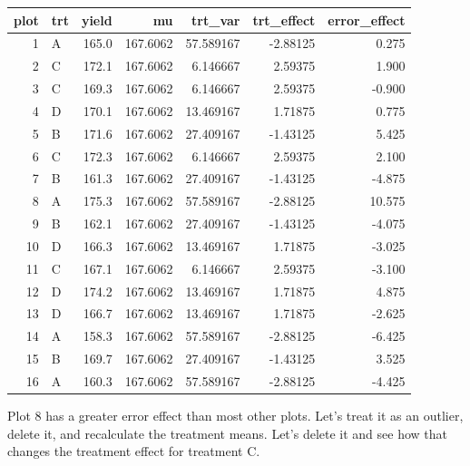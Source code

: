 \documentclass[
]{book}
\begin{document}
\begin{tabular}{r|l|r|r|r|r|r}
\hline
plot & trt & yield & mu & trt\_var & trt\_effect & error\_effect\\
\hline
1 & A & 165.0 & 167.6062 & 57.589167 & -2.88125 & 0.275\\
\hline
2 & C & 172.1 & 167.6062 & 6.146667 & 2.59375 & 1.900\\
\hline
3 & C & 169.3 & 167.6062 & 6.146667 & 2.59375 & -0.900\\
\hline
4 & D & 170.1 & 167.6062 & 13.469167 & 1.71875 & 0.775\\
\hline
5 & B & 171.6 & 167.6062 & 27.409167 & -1.43125 & 5.425\\
\hline
6 & C & 172.3 & 167.6062 & 6.146667 & 2.59375 & 2.100\\
\hline
7 & B & 161.3 & 167.6062 & 27.409167 & -1.43125 & -4.875\\
\hline
8 & A & 175.3 & 167.6062 & 57.589167 & -2.88125 & 10.575\\
\hline
9 & B & 162.1 & 167.6062 & 27.409167 & -1.43125 & -4.075\\
\hline
10 & D & 166.3 & 167.6062 & 13.469167 & 1.71875 & -3.025\\
\hline
11 & C & 167.1 & 167.6062 & 6.146667 & 2.59375 & -3.100\\
\hline
12 & D & 174.2 & 167.6062 & 13.469167 & 1.71875 & 4.875\\
\hline
13 & D & 166.7 & 167.6062 & 13.469167 & 1.71875 & -2.625\\
\hline
14 & A & 158.3 & 167.6062 & 57.589167 & -2.88125 & -6.425\\
\hline
15 & B & 169.7 & 167.6062 & 27.409167 & -1.43125 & 3.525\\
\hline
16 & A & 160.3 & 167.6062 & 57.589167 & -2.88125 & -4.425\\
\hline
\end{tabular}

Plot 8 has a greater error effect than most other plots. Let's treat it as an outlier, delete it, and recalculate the treatment means. Let's delete it and see how that changes the treatment effect for treatment C.
\end{document}
